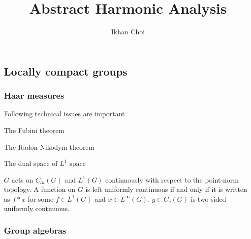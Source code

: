 \documentclass{../../large}
\begin{document}
\title{Abstract Harmonic Analysis}
\author{Ikhan Choi}
\maketitle
\tableofcontents



\part{}

\chapter{Locally compact groups}
\section{Haar measures}

\begin{prb}
Following technical issues are important
\begin{parts}
\item The Fubini theorem
\item The Radon-Nikodym theorem
\item The dual space of $L^1$ space
\end{parts}
\end{prb}

\begin{prb}
\end{prb}

\begin{prb}
\end{prb}

\begin{prb}
\end{prb}

\begin{prb}
$G$ acts on $C_{lu}(G)$ and $L^1(G)$ continuously with respect to the point-norm topology.
A function on $G$ is left uniformly continuous if and only if it is written as $f*x$ for some $f\in L^1(G)$ and $x\in L^\infty(G)$.
$g\in C_c(G)$ is two-sided uniformly continuous.
\end{prb}

\section{Group algebras}
\end{document}
